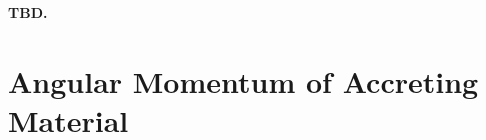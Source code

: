 \documentclass[fleqn,usenatbib]{mnras}
\newcommand{\Rcool}{R_{T=10^5\,{\rm K}}}
\begin{document}
\textbf{TBD.}










\appendix

\section{Angular Momentum of Accreting Material}

\end{document}
